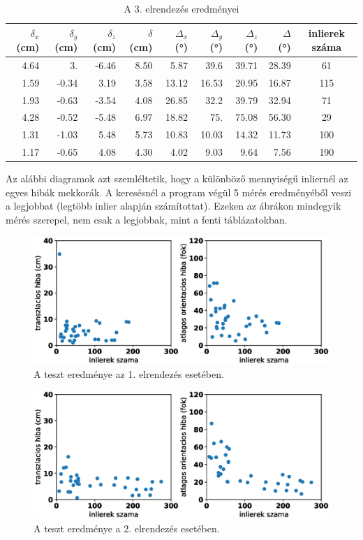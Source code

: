 \begin{table}[H]
\centering
\begin{tabular}{|rrr|r|rrr|r|c|}
\hline 
$\delta_x$ (cm) & $\delta_y$ (cm) & $\delta_z$ (cm) & $\delta$ (cm) & $\Delta_x$ (°) & $\Delta_y$ (°) & $\Delta_z$ (°) & $\Delta$ (°) & inlierek száma \\ \hline
 4.64&	3.&	-6.46&	8.50&	5.87&	39.6&	39.71&	28.39&	61\\
 1.59&	-0.34&	3.19&	3.58&	13.12&	16.53&	20.95&	16.87&	115\\
 1.93&	-0.63&	-3.54&	4.08&	26.85&	32.2&	39.79&	32.94&	71\\
 4.28&	-0.52&	-5.48&	6.97&	18.82&	75.&	75.08&	56.30&	29\\
 1.31&	-1.03&	5.48&	5.73&	10.83&	10.03&	14.32&	11.73&	100\\
 1.17&	-0.65&	4.08&	4.30&	4.02&	9.03&	9.64&	7.56&	190\\
\hline
\end{tabular}
\caption{A 3. elrendezés eredményei}
\end{table}

Az alábbi diagramok azt szemléltetik, hogy a különböző mennyiségű inliernél az egyes hibák mekkorák. A keresésnél a program végül 5 mérés eredményéből veszi a legjobbat (legtöbb inlier alapján számítottat). Ezeken az ábrákon mindegyik mérés szerepel, nem csak a legjobbak, mint a fenti táblázatokban.

\begin{figure}[H]
\centering
\includegraphics[width=0.9\linewidth]{chapters/results/err1.eps}
\caption{A teszt eredménye az 1. elrendezés esetében.}
\label{fig:scatter1}
\end{figure}

\begin{figure}[H]
\centering
\includegraphics[width=0.9\linewidth]{chapters/results/err2.eps}
\caption{A teszt eredménye a 2. elrendezés esetében.}
\label{fig:scatter2}
\end{figure}

